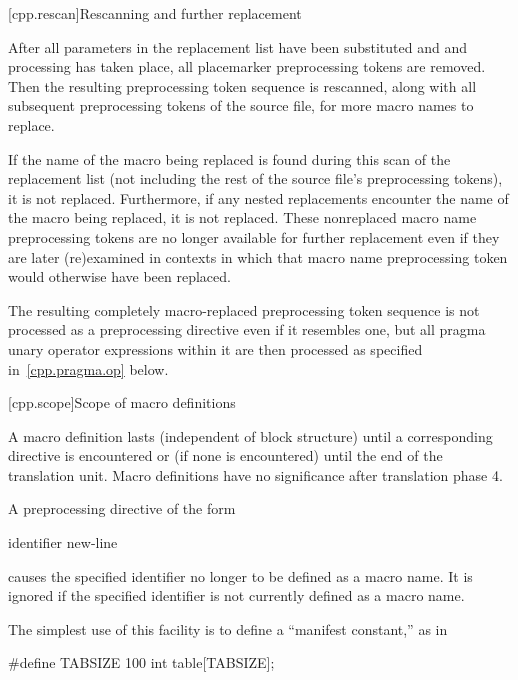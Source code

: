 [cpp.rescan]{Rescanning and further replacement}%
%

\pnum
After all parameters in the replacement list have been substituted and \tcode{\#} and \tcode{\#\#} processing has taken
place, all placemarker preprocessing tokens are removed. Then
the resulting preprocessing token sequence is rescanned, along with all
subsequent preprocessing tokens of the source file, for more macro names
to replace.

\pnum
If the name of the macro being replaced is found during this scan of
the replacement list
(not including the rest of the source file's preprocessing tokens),
it is not replaced.
Furthermore,
if any nested replacements encounter the name of the macro being replaced,
it is not replaced.
These nonreplaced macro name preprocessing tokens are no longer available
for further replacement even if they are later (re)examined in contexts
in which that macro name preprocessing token would otherwise have been
replaced.

\pnum
The resulting completely macro-replaced preprocessing token sequence
is not processed as a preprocessing directive even if it resembles one,
but all pragma unary operator expressions within it are then processed as
specified in~\ref{cpp.pragma.op} below.

[cpp.scope]{Scope of macro definitions}%
%

\pnum
A macro definition lasts
(independent of block structure)
until a corresponding
directive is encountered or
(if none is encountered)
until the end of the translation unit.
Macro definitions have no significance after translation phase 4.

\pnum
A preprocessing directive of the form

\begin{ncsimplebnf}
 identifier new-line
%
\end{ncsimplebnf}

causes the specified identifier no longer to be defined as a macro name.
It is ignored if the specified identifier is not currently defined as
a macro name.

\pnum
\enterexample
The simplest use of this facility is to define a ``manifest constant,''
as in
\begin{codeblock}
#define TABSIZE 100
int table[TABSIZE];
\end{codeblock}
\exitexample

